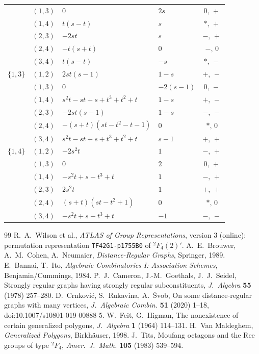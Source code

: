\documentclass[11pt]{article}
\theoremstyle{remark}
\begin{document}
{\begin{longtable}{@{}l c l l c@{}}
 & $(1,3)$ & $0$ & $2 s$ & $0,\,+$ \\
 & $(1,4)$ & $t \left(s - t\right)$ & $s$ & $\ast,\,+$ \\
 & $(2,3)$ & $- 2 s t$ & $s$ & $-,\,+$ \\
 & $(2,4)$ & $- t \left(s + t\right)$ & $0$ & $-,\,0$ \\
 & $(3,4)$ & $t \left(s - t\right)$ & $- s$ & $\ast,\,-$ \\
\midrule
$\{1,3\}$ & $(1,2)$ & $2 s t \left(s - 1\right)$ & $1 - s$ & $+,\,-$ \\
 & $(1,3)$ & $0$ & $- 2 \left(s - 1\right)$ & $0,\,-$ \\
 & $(1,4)$ & $s^{2} t - s t + s + t^{3} + t^{2} + t$ & $1 - s$ & $+,\,-$ \\
 & $(2,3)$ & $- 2 s t \left(s - 1\right)$ & $1 - s$ & $-,\,-$ \\
 & $(2,4)$ & $- \left(s + t\right) \left(s t - t^{2} - t - 1\right)$ & $0$ & $\ast,\,0$ \\
 & $(3,4)$ & $s^{2} t - s t + s + t^{3} + t^{2} + t$ & $s - 1$ & $+,\,+$ \\
\midrule
$\{1,4\}$ & $(1,2)$ & $- 2 s^{2} t$ & $1$ & $-,\,+$ \\
 & $(1,3)$ & $0$ & $2$ & $0,\,+$ \\
 & $(1,4)$ & $- s^{2} t + s - t^{3} + t$ & $1$ & $-,\,+$ \\
 & $(2,3)$ & $2 s^{2} t$ & $1$ & $+,\,+$ \\
 & $(2,4)$ & $\left(s + t\right) \left(s t - t^{2} + 1\right)$ & $0$ & $\ast,\,0$ \\
 & $(3,4)$ & $- s^{2} t + s - t^{3} + t$ & $-1$ & $-,\,-$ \\
\bottomrule
\end{longtable}
}

\begin{thebibliography}{99}
 R.~A.~Wilson et al., \emph{ATLAS of Group Representations}, version 3 (online): permutation representation \texttt{TF42G1-p1755B0} of ${}^2F_4(2)'$.
 A.~E.~Brouwer, A.~M.~Cohen, A.~Neumaier, \emph{Distance-Regular Graphs}, Springer, 1989.
 E.~Bannai, T.~Ito, \emph{Algebraic Combinatorics I: Association Schemes}, Benjamin/Cummings, 1984.
 P.~J.~Cameron, J.-M.~Goethals, J.~J.~Seidel, Strongly regular graphs having strongly regular subconstituents, \emph{J.\ Algebra} \textbf{55} (1978) 257--280.
 D.~Crnkovi\'c, S.~Rukavina, A.~\v{S}vob, On some distance-regular graphs with many vertices, \emph{J.\ Algebraic Combin.} \textbf{51} (2020) 1--18, doi:10.1007/s10801-019-00888-5.
 W.~Feit, G.~Higman, The nonexistence of certain generalized polygons, \emph{J.\ Algebra} \textbf{1} (1964) 114--131.
 H.~Van Maldeghem, \emph{Generalized Polygons}, Birkh\"auser, 1998.
 J.~Tits, Moufang octagons and the Ree groups of type ${}^2F_4$, \emph{Amer.\ J.\ Math.} \textbf{105} (1983) 539--594.
\end{thebibliography}
\end{document}
